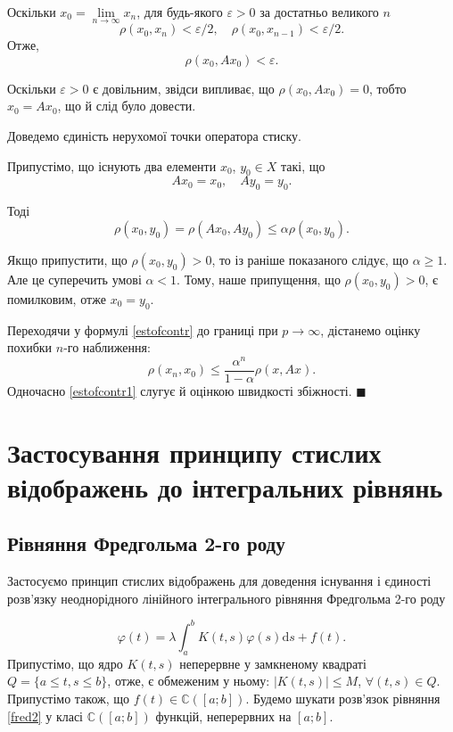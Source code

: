 \documentclass[14pt,twoside]{extreport}
\theoremstyle{mystyle}
\renewenvironment{proof}{{\bfseries Доведення.}}{$\blacksquare$}
\numberwithin{equation}{chapter}
\newcommand{\cab}{\mathbb{C}([a; b])}
\begin{document}
\begin{proof}
Оскільки $x_0 = \lim\limits_{n\to\infty} x_n$, для будь-якого $\varepsilon > 0$ за достатньо великого $n$
\[
 \rho(x_0, x_n) < \varepsilon/2, \quad \rho(x_0, x_{n-1}) < \varepsilon/2.
\]
Отже,
\[
 \rho(x_0, Ax_0)< \varepsilon.
\]

Оскільки $\varepsilon >0$ є довільним, звідси випливає, що $\rho(x_0, Ax_0) = 0$, тобто $x_0 = Ax_0$, що й слід було довести.

Доведемо єдиність нерухомої точки оператора стиску.

Припустімо, що існують два елементи $x_0$, $y_0 \in X$ такі, що
\[
 Ax_0=x_0,\quad Ay_0=y_0.
\]

Тоді
\[
 \rho(x_0, y_0) = \rho(Ax_0, Ay_0) \leqslant \alpha \rho(x_0, y_0).
\]

Якщо припустити, що $\rho(x_0, y_0) >0$, то із раніше показаного слідує, що $\alpha \geqslant 1$. Але це суперечить умові $\alpha < 1$. Тому, наше припущення, що $\rho(x_0, y_0) >0$, є помилковим, отже $x_0=y_0$.

Переходячи у формулі \eqref{estofcontr} до границі при $p\to\infty$, дістанемо оцінку похибки $n$-го наближення:
\begin{equation}\label{estofcontr1}
\rho(x_n, x_0) \leqslant \dfrac{\alpha^n}{1-\alpha} \rho(x, Ax).
\end{equation}
Одночасно \eqref{estofcontr1} слугує й оцінкою швидкості збіжності.
\end{proof}

\section{Застосування принципу стислих відображень до інтегральних рівнянь}

\subsection{Рівняння Фредгольма 2-го роду}\label{secfred2}

Застосуємо принцип стислих відображень для доведення існування і єдиності розв'язку неоднорідного лінійного інтегрального рівняння Фредгольма 2-го роду

\begin{equation}\label{fred2}
 \varphi(t) = \lambda \int_{a}^{b} K(t, s) \varphi(s) \mathrm{d} s + f(t).
\end{equation}
Припустімо, що ядро $K(t, s)$ неперервне у замкненому квадраті $Q=\{a \leqslant t, s \leqslant b\}$, отже, є обмеженим у ньому: $|K(t, s)|\leqslant M$, $\forall(t,s)\in Q$. Припустімо також, що $f(t) \in \cab$. Будемо шукати розв'язок рівняння \eqref{fred2} у класі $\cab$ функцій, неперервних на $[a; b]$.
\end{document}
